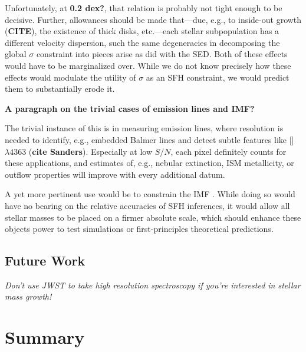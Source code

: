 \documentclass[a4paper,fleqn,usenatbib]{mnras}
\newcommand{\bfr}{\bf\color{red}}
\newcommand{\CITE}{{\bfr CITE}}
\begin{document}
Unfortunately, at {\bfr 0.2 dex?}, that relation is probably not tight enough to be decisive. Further,
allowances should be made that---due, e.g., to inside-out growth (\CITE), the existence of thick disks, 
etc.---each stellar subpopulation has a different velocity dispersion, such the same degeneracies in
decomposing the global $\sigma$ constraint into pieces arise as did with the SED. Both of these 
effects would have to be marginalized over. While we do not know precisely how these effects 
would modulate the utility of $\sigma$ as an SFH constraint, we would predict them to 
substantially erode it.

{\bfr A paragraph on the trivial cases of emission lines and IMF?}

The trivial instance of this is in measuring emission lines, where resolution is needed to 
identify, e.g., embedded Balmer lines and detect subtle features like [] 
$\lambda4363$ ({\bfr cite Sanders}). Especially at low $S/N$, each pixel definitely counts
for these applications, and estimates of, e.g., nebular extinction, ISM metallicity, or outflow
properties will improve with every additional datum.

A yet more pertinent use would be to constrain the IMF \citep{Conroy12}. While doing so 
would have no bearing on the relative accuracies of SFH inferences, it would allow all stellar 
masses to be placed on a firmer absolute scale, which should enhance these objects power to test 
simulations or first-principles theoretical predictions. %
\fi

\subsection{Future Work}
\label{sec:future}

{\it Don't use JWST to take high resolution spectroscopy if you're interested in stellar mass growth!}


\section{Summary}
\label{sec:summary}
\end{document}
